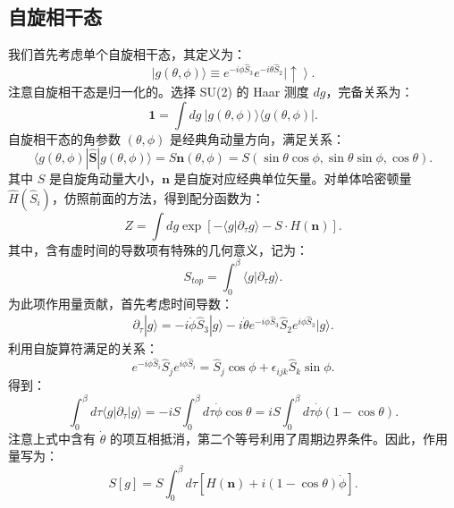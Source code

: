 \documentclass[UTF8]{ctexart}
\begin{document}
\subsection*{自旋相干态}
\noindent
我们首先考虑单个自旋相干态，其定义为：
\begin{equation}
	|g(\theta,\phi) \rangle \equiv e^{-i\phi \hat S_3} e^{-i\theta \hat S_2} \left|\uparrow \right\rangle.
\end{equation}
注意自旋相干态是归一化的。选择 SU(2) 的 Haar 测度 $dg$，完备关系为：
\begin{equation}
	\bm 1 = \int dg\ |g(\theta,\phi)\rangle\langle g(\theta,\phi)|.
\end{equation}
自旋相干态的角参数 $(\theta,\phi)$ 是经典角动量方向，满足关系：
\begin{equation}
	\langle g(\theta,\phi)|\hat{\bm S} |g(\theta,\phi)\rangle 
	= S \bm n(\theta,\phi)
	= S(\sin\theta \cos\phi,\sin\theta \sin\phi,\cos\theta).
\end{equation}
其中 $S$ 是自旋角动量大小，$\bm n$ 是自旋对应经典单位矢量。对单体哈密顿量 $\hat H(\hat S_i)$，仿照前面的方法，得到配分函数为：
\begin{equation}
	Z = \int dg \exp\left[-\langle g|\partial_\tau g\rangle -S\cdot H(\bm n) \right].
\end{equation}
其中，含有虚时间的导数项有特殊的几何意义，记为：
\begin{equation}
	S_{top}=\int_0^\beta \langle g|\partial_\tau g \rangle.
\end{equation}
为此项作用量贡献，首先考虑时间导数：
\begin{eqnarray}
	\partial_\tau |g\rangle = -i \dot{\phi} \hat S_3 |g\rangle
	-i \dot{\theta} e^{-i\phi \hat S_3} \hat S_2 e^{i\phi \hat S_3}|g\rangle.
\end{eqnarray}
利用自旋算符满足的关系：
\begin{equation}
	e^{-i\phi\hat S_i} \hat S_j e^{i\phi\hat S_i}
	= \hat S_j \cos\phi + \epsilon_{ijk}\hat S_k \sin\phi.
\end{equation}
得到：
\begin{equation}
	\int_0^\beta d\tau \langle g|\partial_\tau |g\rangle
	= -i S \int_0^\beta d\tau \dot{\phi} \cos\theta
	= i S \int_0^\beta d\tau \dot{\phi} (1-\cos\theta).
\end{equation}
注意上式中含有 $\dot\theta$ 的项互相抵消，第二个等号利用了周期边界条件。因此，作用量写为：
\begin{equation}
	S[g] = S\int_0^\beta d\tau \left[H(\bm n)+i(1-\cos\theta)\dot{\phi} \right].
\end{equation}
\end{document}

